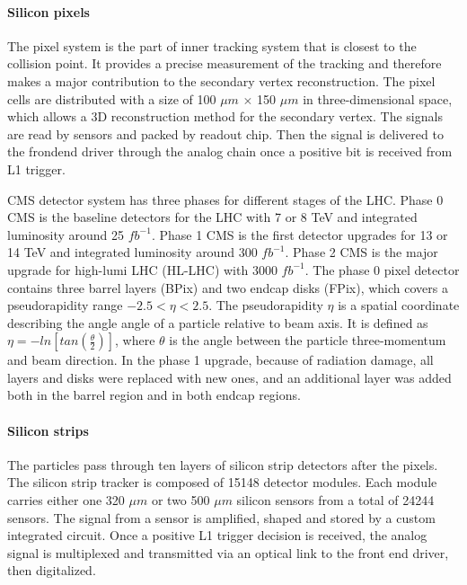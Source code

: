 \paragraph{Silicon pixels}
The pixel system is the part of inner tracking system that is closest to the collision point. It provides a precise measurement of the tracking and therefore makes a major contribution to the secondary vertex reconstruction. The pixel cells are distributed with a size of 100 $\mu m$ $\times$ 150 $\mu m$ in three-dimensional space, which allows a 3D reconstruction method for the secondary vertex. The signals are read by sensors and packed by readout chip. Then the signal is delivered to the frondend driver through the analog chain once a positive bit is received from L1 trigger.

CMS detector system has three phases for different stages of the LHC. Phase 0 CMS is the baseline detectors for the LHC with 7 or 8 TeV and integrated luminosity around 25 $fb^{-1}$. Phase 1 CMS is the first detector upgrades for 13 or 14 TeV and integrated luminosity around 300 $fb^{-1}$. Phase 2 CMS is the major upgrade for high-lumi LHC (HL-LHC) with 3000 $fb^{-1}$. The phase 0 pixel detector contains three barrel layers (BPix) and two endcap disks (FPix), which covers a pseudorapidity range $-2.5<\eta<2.5$. The pseudorapidity $\eta$ is a spatial coordinate describing the angle angle of a particle relative to beam axis. It is defined as $\eta = -ln[tan(\frac{\theta}{2})]$, where $\theta$ is the angle between the particle three-momentum and beam direction. In the phase 1 upgrade\cite{Klein:2140071}, because of radiation damage, all layers and disks were replaced with new ones, and an additional layer was added both in the barrel region and in both endcap regions.


\paragraph{Silicon strips}

The particles pass through ten layers of silicon strip detectors after the pixels. The silicon strip tracker is composed of 15148 detector modules. Each module carries either one 320 $\mu m$ or two 500 $\mu m$ silicon sensors from a total of 24244 sensors. The signal from a sensor is amplified, shaped and stored by a custom integrated circuit. Once a positive L1 trigger decision is received, the analog signal is multiplexed and transmitted via an optical link to the front end driver, then digitalized. 

